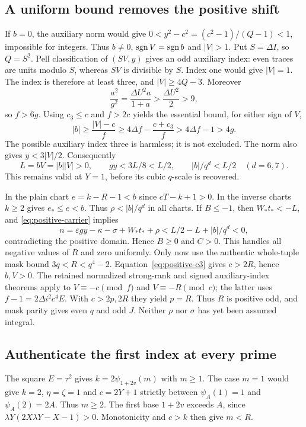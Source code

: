 \subsection{A uniform bound removes the positive shift}
If $b=0$, the auxiliary norm would give
$0<y^2-c^2=(c^2-1)/(Q-1)<1$, impossible for integers.
Thus $b\ne0$, $\operatorname{sgn} V=\operatorname{sgn} b$ and $|V|>1$.
Put $S=\Delta I$, so $Q=S^2$. Pell classification of $(SV,y)$
gives an odd auxiliary index: even traces are units modulo $S$,
whereas $SV$ is divisible by $S$. Index one would give $|V|=1$.
The index is therefore at least three, and $|V|\ge4Q-3$.
Moreover
\[
 \frac{a^2}{g^2}=\frac{\Delta U^2a}{1+a}>
 \frac{\Delta U^2}{2}>9,
\]
so $f>6g$. Using $c_3\le c$ and $f>2c$ yields the essential
bound, for either sign of $V$,
\begin{equation}\label{eq:positive-uniform}
 |b|\ge\frac{|V|-c}{f}
 \ge4\Delta f-\frac{c+c_3}{f}
 >4\Delta f-1>4g.
\end{equation}
The possible auxiliary index three is harmless; it is not excluded.
The norm also gives $y<3|V|/2$. Consequently
\[
 L=bV=|b||V|>0,\qquad gy<3L/8<L/2,
 \qquad |b|/q^d<L/2\quad(d=6,7).
\]
This remains valid at $Y=1$, before its cubic $q$-scale is recovered.

In the plain chart $e=k-R-1<b$ since $cT-k+1>0$.
In the inverse charts $k\ge2$ gives $e_*\le e<b$.
Thus $\rho<|b|/q^d$ in all charts. If $B\le-1$, then
$W_*t_*<-L$, and \eqref{eq:positive-carrier} implies
\[
 n=\varepsilon gy-\kappa-\sigma+W_*t_*+\rho
 <L/2-L+|b|/q^d<0,
\]
contradicting the positive domain. Hence $B\ge0$ and $C>0$.
This handles all negative values of $R$ and zero uniformly.
Only now use the authentic whole-tuple mask bound $3q<R<q^4-2$.
Equation~\eqref{eq:positive-c3} gives $c>2R$, hence $b,V>0$.
The retained normalized strong-rank and signed auxiliary-index theorems
apply to $V\equiv-c\pmod f$ and $V\equiv-R\pmod c$;
the latter uses $f-1=2\Delta i^2c^4E$. With $c>2p,2R$
they yield $p=R$. Thus $R$ is positive odd, and mask parity gives
even $q$ and odd $J$. Neither $\rho$ nor $\sigma$ has yet been
assumed integral.

\subsection{Authenticate the first index at every prime}
The square $E=\tau^2$ gives $k=2\psi_{1+2v}(m)$ with $m\ge1$.
The case $m=1$ would give $k=2$, $\eta=\zeta=1$ and
$c=2Y+1$ strictly between $\psi_A(1)=1$ and $\psi_A(2)=2A$.
Thus $m\ge2$. The first base $1+2v$ exceeds $A$, since
$\lambda Y(2X\lambda Y-X-1)>0$. Monotonicity and $c>k$
then give $m<R$.

